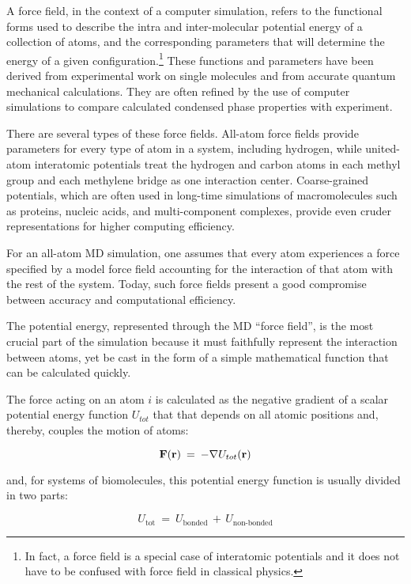 A force field, in the context of a computer simulation, refers to the functional forms used to describe the intra and inter-molecular potential energy of a collection of atoms, and the corresponding parameters that will determine the energy of a given configuration.\footnote{In fact, a force field is a special case of interatomic potentials and it does not have to be confused with force field in classical physics.} 
These functions and parameters have been derived from experimental work on single molecules and from accurate quantum mechanical calculations. They are often refined by the use of computer simulations to compare calculated condensed phase properties with experiment. 

There are several types of these force fields. All-atom force fields provide parameters for every type of atom in a system, including hydrogen, while united-atom interatomic potentials treat the hydrogen and carbon atoms in each methyl group and each methylene bridge as one interaction center. Coarse-grained potentials, which are often used in long-time simulations of macromolecules such as proteins, nucleic acids, and multi-component complexes, provide even cruder representations for higher computing efficiency.

For an all-atom MD simulation, one assumes that every atom experiences a force specified by a model force field accounting for the interaction of that atom with the rest of the system. Today, such force fields present a good compromise between accuracy and computational efficiency. 

The potential energy, represented through the MD ``force field'', is the most crucial part of the simulation because it must faithfully represent the interaction between atoms, yet be cast in the form of a simple mathematical function that can be calculated quickly.

The force acting on an atom $i$ is calculated as the negative gradient of a scalar potential energy function $U_{tot}$ that that depends on all atomic positions and, thereby, couples the motion of atoms:

\begin{equation}
\bold{F} (\bold{r}) \: = \: - \bold{\nabla} U_{tot} (\bold{r})
\end{equation}

and, for systems of biomolecules, this potential energy function is usually divided in two parts:

\begin{equation}\label{eq:NAMD-PotEnergy}
U_{\text{tot}} \: = \: U_{\text{bonded}} \, + \, U_{\text{non-bonded}} 
\end{equation}

